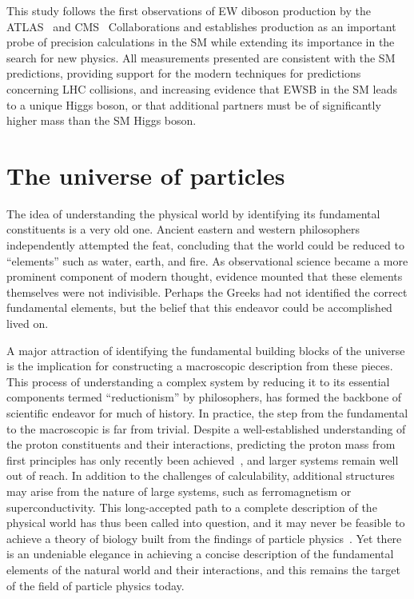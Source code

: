 This study follows the first observations of EW diboson production
by the ATLAS~\cite{ATLAS-CONF-2018-030,ATLAS-CONF-2018-033} and CMS~\cite{Sirunyan:2017ret} Collaborations
and establishes \EWWZ production as an important
probe of precision calculations in the SM while extending its importance 
in the search for new physics.
All measurements presented are consistent with the SM predictions,
providing support for the modern techniques for predictions concerning LHC collisions, and 
increasing evidence that EWSB in the SM leads to a unique Higgs boson,
or that additional partners must be of significantly higher mass than the
SM Higgs boson.

\section{The universe of particles}

The idea of understanding the physical world by identifying its
fundamental constituents is a very old one. Ancient eastern and
western philosophers independently attempted the feat, concluding
that the world could be reduced 
to ``elements'' such as water, earth, and fire.
As observational science became a more prominent component of modern thought, 
evidence mounted that these elements themselves were 
not indivisible. Perhaps the Greeks had not identified
the correct fundamental elements, but the belief that this endeavor could
be accomplished lived on.

A major attraction of identifying the fundamental building blocks of the universe
is the implication for constructing a macroscopic description from these
pieces. This process of understanding a complex system 
by reducing it to its essential components
termed ``reductionism'' by philosophers, 
has formed the backbone of scientific endeavor for much of history.
In practice, the step from the fundamental to the macroscopic 
is far from trivial. Despite a well-established
understanding of the proton constituents and their interactions,
predicting the proton mass from first principles has only recently 
been achieved~\cite{Durr:2008zz}, and larger systems remain well
out of reach.
In addition to the challenges of calculability, additional structures
may arise from the nature of large systems, such as ferromagnetism or 
superconductivity.
This long-accepted path to a complete description of the physical world
has thus been called into question, and it may never be feasible
to achieve a theory of biology built from the findings of particle 
physics~\cite{Anderson393}.
Yet there is an undeniable elegance in achieving a concise description
of the fundamental elements of the natural world and their interactions,
and this remains the target of the field of particle physics today. 

